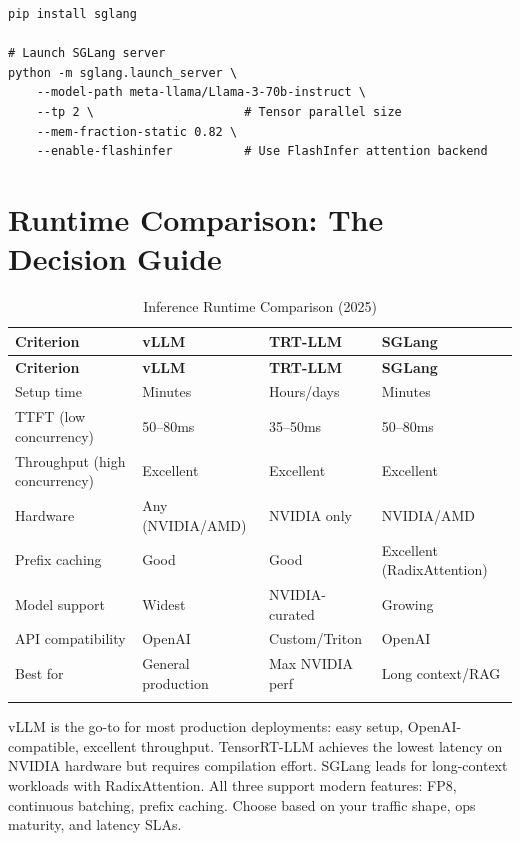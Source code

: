 \documentclass[10pt, oneside, openany]{book}
\newenvironment{chapsummary}
  {\begin{tcolorbox}[enhanced, breakable,
    colback={rgb,255:red,245;green,245;blue,225},
    colframe=AccentOrange, boxrule=1.5pt, arc=4pt,
    title={\bfseries Chapter Summary},
    fonttitle=\bfseries\color{white},
    attach boxed title to top left={yshift=-2mm, xshift=5mm},
    boxed title style={colback=AccentOrange, arc=2pt}]}
  {\end{tcolorbox}}
\begin{document}
\begin{lstlisting}[style=bashstyle, caption={Starting SGLang server}]
pip install sglang

# Launch SGLang server
python -m sglang.launch_server \
    --model-path meta-llama/Llama-3-70b-instruct \
    --tp 2 \                     # Tensor parallel size
    --mem-fraction-static 0.82 \
    --enable-flashinfer          # Use FlashInfer attention backend
\end{lstlisting}

\section{Runtime Comparison: The Decision Guide}

\begin{longtable}{@{}p{3cm}p{3cm}p{3cm}p{3cm}@{}}
  \toprule
  \textbf{Criterion} & \textbf{vLLM} & \textbf{TRT-LLM} & \textbf{SGLang} \\
  \midrule
  \endfirsthead
  \toprule
  \textbf{Criterion} & \textbf{vLLM} & \textbf{TRT-LLM} & \textbf{SGLang} \\
  \midrule
  \endhead
  Setup time & Minutes & Hours/days & Minutes \\
  TTFT (low concurrency) & 50--80ms & 35--50ms & 50--80ms \\
  Throughput (high concurrency) & Excellent & Excellent & Excellent \\
  Hardware & Any (NVIDIA/AMD) & NVIDIA only & NVIDIA/AMD \\
  Prefix caching & Good & Good & Excellent (RadixAttention) \\
  Model support & Widest & NVIDIA-curated & Growing \\
  API compatibility & OpenAI & Custom/Triton & OpenAI \\
  Best for & General production & Max NVIDIA perf & Long context/RAG \\
  \bottomrule
  \caption{Inference Runtime Comparison (2025)}
\end{longtable}

\begin{chapsummary}
vLLM is the go-to for most production deployments: easy setup, OpenAI-compatible,
excellent throughput.  TensorRT-LLM achieves the lowest latency on NVIDIA hardware
but requires compilation effort.  SGLang leads for long-context workloads with
RadixAttention.  All three support modern features: FP8, continuous batching,
prefix caching.  Choose based on your traffic shape, ops maturity, and latency SLAs.
\end{chapsummary}
\end{document}

